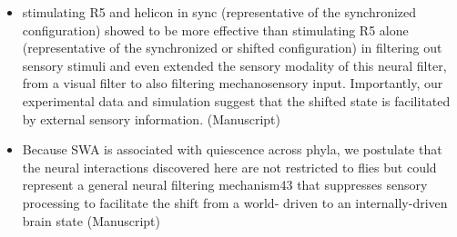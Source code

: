 \documentclass[11pt]{article}
\begin{document}
\begin{itemize}
    \item stimulating R5 and helicon in sync (representative of the
    synchronized configuration) showed to be more effective than stimulating R5 alone
    (representative of the synchronized or shifted configuration) in filtering out sensory stimuli
    and even extended the sensory modality of this neural filter, from a visual filter to also filtering
    mechanosensory input. Importantly, our experimental data and simulation suggest that the
    shifted state is facilitated by external sensory information.
    \parencite{raccugliaCoherentMultilevelNetwork2022} (Manuscript)

    \item Because SWA is associated with quiescence across phyla, we postulate that the neural
    interactions discovered here are not restricted to flies but could represent a general neural
    filtering mechanism43 that suppresses sensory processing to facilitate the shift from a world-
    driven to an internally-driven brain state
    \parencite{raccugliaCoherentMultilevelNetwork2022} (Manuscript)

\end{itemize}
\end{document}
